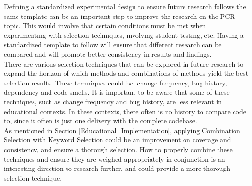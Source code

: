 Defining a standardized experimental design to ensure future research follows the same template can be an important step to improve the research on the PCR topic. This would involve that certain conditions must be met when experimenting with selection techniques, involving student testing, etc. Having a standardized template to follow will ensure that different research can be compared and will promote better consistency in results and findings. \\

There are various selection techniques that can be explored in future research to expand the horizon of which methods and combinations of methods yield the best selection results. These techniques could be; change frequency, bug history, dependency and code smells. It is important to be aware that some of these techniques, such as change frequency and bug history, are less relevant in educational contexts. In these contexts, there often is no history to compare code to, since it often is just one delivery with the complete codebase. \\

As mentioned in Section \ref{Educational_Implementation}, applying Combination Selection with Keyword Selection could be an improvement on coverage and consistency, and ensure a thorough selection. How to properly combine these techniques and ensure they are weighed appropriately in conjunction is an interesting direction to research further, and could provide a more thorough selection technique.






